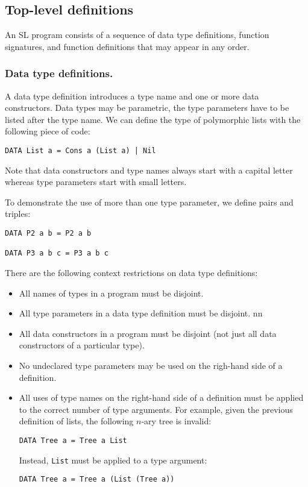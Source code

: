 \documentclass{article}
\begin{document}
\subsection{Top-level definitions}
\label{sec:definitions}

An SL program consists of a sequence of data type definitions,
function signatures, and function definitions that may appear in any
order.

\subsubsection{Data type definitions.}
\label{sec:data-type-defin}

A data type definition introduces a type name and one or more data
constructors. Data types may be parametric, the type parameters have
to be listed after the type name. We can define the type of
polymorphic lists with the following piece of code:
\begin{verbatim}
DATA List a = Cons a (List a) | Nil
\end{verbatim}
Note that data constructors and type names always start with a capital
letter whereas type parameters start with small letters.

To demonstrate the use of more than one type parameter, we define
pairs and triples:
\begin{verbatim}
DATA P2 a b = P2 a b

DATA P3 a b c = P3 a b c
\end{verbatim}
There are the following context restrictions on data type definitions:
\begin{itemize}
\item All names of types in a program must be disjoint.
\item All type parameters in a data type definition must be disjoint.
nn\item All data constructors in a program must be disjoint (not just
  all data constructors of a particular type).
\item No undeclared type parameters may be used on the righ-hand side
  of a definition.
\item All uses of type names on the right-hand side of a definition
  must be applied to the correct number of type arguments. For
  example, given the previous definition of lists, the following
  $n$-ary tree is invalid:
\begin{verbatim}
DATA Tree a = Tree a List
\end{verbatim}
  Instead, \verb|List| must be applied to a type argument:
\begin{verbatim}
DATA Tree a = Tree a (List (Tree a))
\end{verbatim}
\end{itemize}
\end{document}

